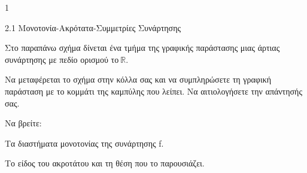 \begin{ylh}{1}
\item 2.1 Μονοτονία-Ακρότατα-Συμμετρίες Συνάρτησης
\end{ylh}
\begin{center}
\end{center}
Στο παραπάνω σχήμα δίνεται ένα τμήμα της γραφικής παράστασης μιας άρτιας συνάρτησης με πεδίο ορισμού το$\ \mathbb{R.}$
\begin{alist}
\item Να μεταφέρεται το σχήμα στην κόλλα σας και να συμπληρώσετε τη γραφική παράσταση με το κομμάτι της καμπύλης που λείπει. Να αιτιολογήσετε την απάντησής σας.
\item Να βρείτε:
\begin{rlist}
\item Τα διαστήματα μονοτονίας της συνάρτησης f.
\item Tο είδος του ακροτάτου και τη θέση που το παρουσιάζει.
\end{rlist}
\end{alist}

